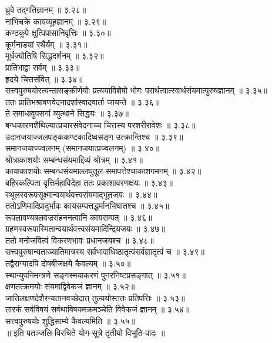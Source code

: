 \begin{multicols}{2}
\begin{flushleft}
ध्रुवे तद्गतिज्ञानम् ॥ ३.२८॥\\
नाभिचक्रे कायव्यूहज्ञानम् ॥ ३.२९॥\\
कण्ठकूपे क्षुत्पिपासानिवृत्तिः ॥ ३.३०॥\\
कूर्मनाड्यां स्थैर्यम् ॥ ३.३१॥\\
मूर्धज्योतिषि सिद्धदर्शनम् ॥ ३.३२॥\\
प्रातिभाद्वा सर्वम् ॥ ३.३३॥\\
हृदये चित्तसंवित् ॥ ३.३४॥\\
सत्त्वपुरुषयोरत्यन्तासङ्कीर्णयोः प्रत्ययाविशेषो भोगः परार्थत्वात्स्वार्थसंयमात्पुरुषज्ञानम् ॥ ३.३५॥\\
ततः प्रातिभश्रावणवेदनादर्शास्वादवार्ता जायन्ते ॥ ३.३६॥\\
ते समाधावुपसर्गा व्युत्थाने सिद्धयः ॥ ३.३७॥\\
बन्धकारणशैथिल्यात्प्रचारसंवेदनाच्च चित्तस्य परशरीरावेशः ॥ ३.३८॥\\
उदानजयाज्जलपङ्ककण्टकादिष्वसङ्ग उत्क्रान्तिश्च ॥ ३.३९॥\\
समानजयाज्ज्वलनम्  (समानजयात्प्रज्वलनम्) ॥ ३.४०॥\\
श्रोत्राकाशयोः सम्बन्धसंयमाद्दिव्यं श्रोत्रम् ॥ ३.४१॥\\
कायाकाशयोः सम्बन्धसंयमाल्लघुतूल-समापत्तेश्चाकाशगमनम् ॥ ३.४२॥\\
बहिरकल्पिता वृत्तिर्महाविदेहा ततः प्रकाशावरणक्षयः ॥ ३.४३॥\\
स्थूलस्वरूपसूक्ष्मान्वयार्थवत्त्वसंयमाद्भूतजयः ॥ ३.४४॥\\
ततोऽणिमादिप्रादुर्भावः कायसम्पत्तद्धर्मानभिघातश्च ॥ ३.४५॥\\
रूपलावण्यबलवज्रसंहननत्वानि कायसम्पत् ॥ ३.४६॥\\
ग्रहणस्वरूपास्मितान्वयार्थवत्त्वसंयमादिन्द्रियजयः ॥ ३.४७॥\\
ततो मनोजवित्वं विकरणभावः प्रधानजयश्च ॥ ३.४८॥\\
सत्त्वपुरुषान्यताख्यातिमात्रस्य सर्वभावाधिष्ठातृत्वंसर्वज्ञातृत्वं च ॥ ३.४९॥\\
तद्वैराग्यादपि दोषबीजक्षये कैवल्यम् ॥ ३.५०॥\\
स्थान्युपनिमन्त्रणे सङ्गस्मयाकरणं पुनरनिष्टप्रसङ्गात् ॥ ३.५१॥\\
क्षणतत्क्रमयोः संयमाद्विवेकजं ज्ञानम् ॥ ३.५२॥\\
जातिलक्षणदेशैरन्यतानवच्छेदात् तुल्ययोस्ततः प्रतिपत्तिः ॥ ३.५३॥\\
तारकं सर्वविषयं सर्वथाविषयमक्रमञ्चेति विवेकजं ज्ञानम् ॥ ३.५४॥\\
सत्त्वपुरुषयोः शुद्धिसाम्ये कैवल्यमिति ॥ ३.५५॥\\
॥ इति पतञ्जलि-विरचिते योग-सूत्रे तृतीयो विभूति-पादः ॥\\
\end{flushleft}


\end{multicols}
